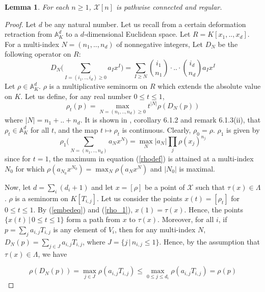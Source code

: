 \documentclass{amsart}
\theoremstyle{theorem}
\theoremstyle{lemma}
\newtheorem{lemma}{Lemma}[section]
\theoremstyle{prop}
\theoremstyle{definition}
\theoremstyle{corollary}
\theoremstyle{remark}
\newcommand{\A}{\mathbb{A}}
\newcommand{\X}{\mathcal{X}}
\begin{document}
\begin{lemma}
For each $n\geq 1$, $\X[n]$ is pathwise connected and regular.
\end{lemma}

\begin{proof}
Let $d$ be any natural number. Let us recall from \cite{ber2} a certain deformation retraction from $\A^d_K$ to a $d$-dimensional Euclidean space.
Let $R=K[x_1,..,x_d]$. For a multi-index $N=(n_1,..,n_d)$ of nonnegative integers, Let $D_N$ be the following operator on $R$:
$$ D_N \Big( \sum_{I=(i_1,..,i_d)\geq 0} a_I x^I  \Big)= \sum_{I \geq N} \binom{i_1}{n_1} \cdot..\cdot \binom{i_d}{n_d} a_I x^I $$
Let $\rho \in \A^d_K$. $\rho$ is a multiplicative seminorm on $R$ which extends the absolute value on $K$. Let us define, for any real number $0 \leq t \leq 1$, 
\begin{equation}
\label{rhodef}
 \rho_t (p) = \max _{N=(n_1,..,n_d)\geq 0} t^{|N|} \rho(D_N (p))
\end{equation}
where $|N|=n_1 + .. + n_d$. It is shown in \cite{ber2}, corollary 6.1.2 and remark 6.1.3(ii), that $\rho_t \in \A^d_K$ for all $t$, and the map $t \mapsto \rho_t$ is continuous.
Clearly, $\rho_0=\rho$. $\rho_1$ is given by
\begin{equation}
\label{rho_1}
\rho_1 \Big( \sum_{N=(n_1,..,n_d)} a_N x^N \Big)= \max_N |a_N| \prod_j \rho(x_j)^{n_j}
\end{equation}
since for $t=1$, the maximum in equation (\ref{rhodef}) is attained at a multi-index $N_0$ for which $\rho(a_{N_0} x^{N_0})=\max_N \rho(a_{N} x^{N})$ and $|N_0|$ is maximal. 

Now, let $d=\sum_i (d_i+1)$ and let $x=[\rho]$ be a point of $\X$ such that $\tau(x) \in \Lambda$. $\rho$ is a seminorm on $K[T_{i,j}]$. 
Let us consider the points $x(t)=[\rho_t]$ for $0\leq t \leq 1$. By  (\ref{embedeq}) and (\ref{rho_1}), $x(1)=\tau(x)$. Hence, the points $\{x(t) \, | \, 0\leq t \leq 1 \}$ form a path from $x$ to $\tau(x)$. Moreover, for all $i$, if $p=\sum_{j} a_{i,j}T_{i,j}$ is any element of $V_i$,
then for any multi-index $N$,  $D_N (p)=\sum_{j\in J} a_{i,j}T_{i,j}$, where $J=\{j \,|\, n_{i,j} \leq 1 \}$. Hence, by the assumption that $\tau(x) \in \Lambda$, we have

$$\rho(D_N (p))=\max_{j \in J} \rho(a_{i,j}T_{i,j}) \leq \max_{0\leq j \leq d_i} \rho(a_{i,j}T_{i,j}) = \rho(p) $$


\end{proof}
\end{document}
